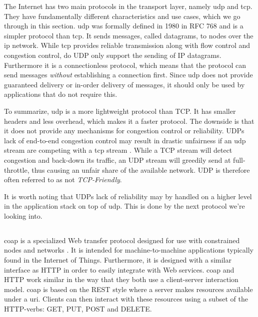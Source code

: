 The Internet has two main protocols in the transport layer, namely \gls{udp} and
\gls{tcp}. They have fundamentally different characteristics and use cases,
which we go through in this section. \gls{udp} was formally defined in 1980 in
RFC 768\cite{rfc-udp} and is a simpler protocol than \gls{tcp}. It sends
messages, called datagrams, to nodes over the \gls{ip} network. While \gls{tcp}
provides reliable transmission along with flow control and congestion control,
do UDP only support the sending of IP datagrams. Furthermore it is a
connectionless protocol, which means that the protocol can send messages
\textit{without} establishing a connection first. Since \gls{udp} does not
provide guaranteed delivery or in-order delivery of messages, it should only be
used by applications that do not require this.

To summarize, \gls{udp} is a more lightweight protocol than TCP. It has smaller
headers and less overhead, which makes it a faster protocol. The downside is
that it does not provide any mechanisms for congestion control or reliability.
UDPs lack of end-to-end congestion control may result in drastic unfairness if
an \gls{udp} stream are competing with a \gls{tcp}
stream \cite{floyd-congestion}. While a TCP stream will detect congestion and
back-down its traffic, an UDP stream will greedily send at full-throttle, thus
causing an unfair share of the available network. UDP is therefore often
referred to as not \textit{TCP-Friendly}.

 It is worth noting that UDPs lack of reliability may by handled on a higher
 level in the application stack on top of \gls{udp}. This is done by the next
 protocol we're looking into.

\subsection{}

\gls{coap} is a specialized Web transfer protocol designed for use with
constrained nodes and  networks \cite{rfc-7252}. It is intended for
machine-to-machine applications typically found in the Internet of Things.
Furthermore, it is designed with a similar interface as HTTP in order to easily
integrate with Web services. \gls{coap} and HTTP work similar in the way that
they both use a client-server interaction model. \Gls{coap} is based on the REST
style where a server makes resources available under a \gls{uri}. Clients can
then interact with these resources using a subset of the HTTP-verbs: GET, PUT,
POST and DELETE.

